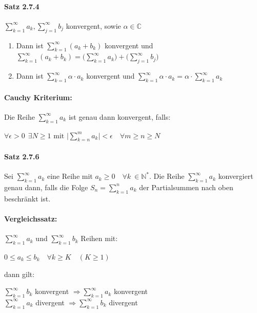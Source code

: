 \documentclass[8pt]{extreport}
\begin{document}
\paragraph{Satz 2.7.4} $\displaystyle\sum_{k=1}^{\infty}a_{k}, \displaystyle\sum_{j=1}^{\infty}b_{j}$ konvergent, sowie $\alpha \in \mathbb{C}$
\begin{enumerate}
\item Dann ist $\displaystyle\sum_{k=1}^{\infty} (a_{k} + b_{k})$ konvergent und $\displaystyle\sum_{k=1}^{\infty} (a_{k} + b_{k}) = \bigg( \displaystyle\sum_{k=1}^{\infty} a_{k}\bigg) + \bigg( \displaystyle\sum_{j=1}^{\infty}b_{j}\bigg)$
\item Dann ist $ \displaystyle\sum_{k=1}^{\infty} \alpha \cdot a_{k}$ konvergent und $ \displaystyle\sum_{k=1}^{\infty} \alpha \cdot a_{k} = \alpha \cdot \displaystyle\sum_{k=1}^{\infty}a_{k} $
\end{enumerate}
\paragraph{Cauchy Kriterium:} Die Reihe $\displaystyle\sum_{k=1}^{\infty}a_{k}$ ist genau dann konvergent, falls:
\begin{center}
$\forall \epsilon > 0 \ \ \exists N \geq 1 \text{ mit } \bigg|\displaystyle\sum_{k=n}^{m}a_{k}\bigg| < \epsilon \quad  \forall m\geq n \geq N$
\end{center}
\paragraph{Satz 2.7.6} Sei $\displaystyle\sum_{k=1}^{\infty}a_{k}$ eine Reihe mit $a_k \geq 0 \quad    \forall k \ \in \mathbb{N}^*$. Die Reihe $\displaystyle\sum_{k=1}^{\infty}a_{k}$ konvergiert genau dann, falls die Folge $S_n=\displaystyle\sum_{k=1}^{n}a_{k}$ der Partialsummen nach oben beschränkt ist.
\paragraph{Vergleichssatz:} $\displaystyle\sum_{k=1}^{\infty}a_{k}$ und $\displaystyle\sum_{k=1}^{\infty}b_{k}$
Reihen mit:
\begin{center}
$0\leq a_k \leq b_k \quad \forall k \geq K \quad (K \geq 1)$
\end{center}
dann gilt:
\begin{center}
$\displaystyle\sum_{k=1}^{\infty}b_{k}$ konvergent $\Rightarrow \displaystyle\sum_{k=1}^{\infty}a_{k}$ konvergent\\
$\displaystyle\sum_{k=1}^{\infty}a_{k}$ divergent $\Rightarrow \displaystyle\sum_{k=1}^{\infty}b_{k}$ divergent
\end{center}
\end{document}
